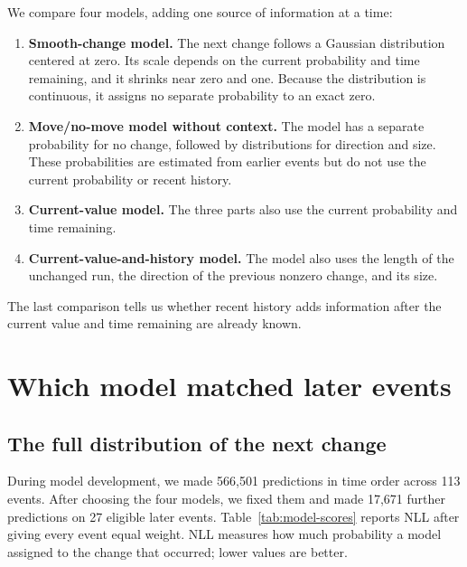 \documentclass[10pt,twoside]{article}
\begin{document}
We compare four models, adding one source of information at a time:
\begin{enumerate}[leftmargin=2em,itemsep=0.25em]
  \item \textbf{Smooth-change model.} The next change follows a Gaussian distribution centered at zero. Its scale depends on the current probability and time remaining, and it shrinks near zero and one. Because the distribution is continuous, it assigns no separate probability to an exact zero.
  \item \textbf{Move/no-move model without context.} The model has a separate probability for no change, followed by distributions for direction and size. These probabilities are estimated from earlier events but do not use the current probability or recent history.
  \item \textbf{Current-value model.} The three parts also use the current probability and time remaining.
  \item \textbf{Current-value-and-history model.} The model also uses the length of the unchanged run, the direction of the previous nonzero change, and its size.
\end{enumerate}
The last comparison tells us whether recent history adds information after the current value and time remaining are already known.

\section{Which model matched later events}

\subsection{The full distribution of the next change}

During model development, we made 566,501 predictions in time order across 113 events. After choosing the four models, we fixed them and made 17,671 further predictions on 27 eligible later events. Table~\ref{tab:model-scores} reports NLL after giving every event equal weight. NLL measures how much probability a model assigned to the change that occurred; lower values are better.
\end{document}

